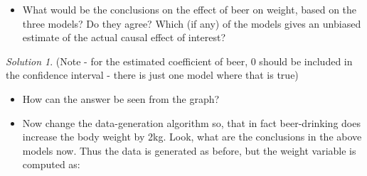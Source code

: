 \documentclass[
]{book}
\newenvironment{Shaded}{\begin{snugshade}}{\end{snugshade}}
\newcommand{\AttributeTok}[1]{\textcolor[rgb]{0.13,0.29,0.53}{#1}}
\newcommand{\DecValTok}[1]{\textcolor[rgb]{0.00,0.00,0.81}{#1}}
\newcommand{\FloatTok}[1]{\textcolor[rgb]{0.00,0.00,0.81}{#1}}
\newcommand{\FunctionTok}[1]{\textcolor[rgb]{0.13,0.29,0.53}{\textbf{#1}}}
\newcommand{\NormalTok}[1]{#1}
\newcommand{\OtherTok}[1]{\textcolor[rgb]{0.56,0.35,0.01}{#1}}
\newcommand{\SpecialCharTok}[1]{\textcolor[rgb]{0.81,0.36,0.00}{\textbf{#1}}}
\providecommand{\tightlist}{%
  \setlength{\itemsep}{0pt}\setlength{\parskip}{0pt}}
\theoremstyle{definition}
\theoremstyle{definition}
\theoremstyle{definition}
\theoremstyle{definition}
\theoremstyle{remark}
\newtheorem*{solution}{Solution}
\begin{document}
\begin{itemize}
\tightlist
\item
  What would be the conclusions on the effect of beer on weight, based on the three models? Do they agree? Which (if any) of the models gives an unbiased estimate of the actual causal effect of interest?
\end{itemize}

\begin{solution}
(Note - for the estimated coefficient of beer, 0 should be included in the confidence interval - there is just one model where that is true)
\end{solution}

\begin{itemize}
\item
  How can the answer be seen from the graph?
\item
  Now change the data-generation algorithm so, that in fact beer-drinking does increase the body weight by 2kg. Look, what are the conclusions in the above models now. Thus the data is generated as before, but the weight variable is computed as:
\end{itemize}

\begin{Shaded}
\end{Shaded}

\begin{Shaded}
\end{Shaded}
\end{document}
